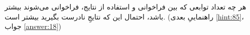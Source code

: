 \section{}
\paragraph{}\label{hint:24}
هر چه تعداد توابعی که بین فراخوانی  و استفاده از نتایج، فراخوانی می‌شوند بیشتر باشد، احتمال این که نتایجِ نادرست بگیرید بیشتر است. (راهنماییِ بعدی \ref{hint:85}، جواب \ref{answer:18})